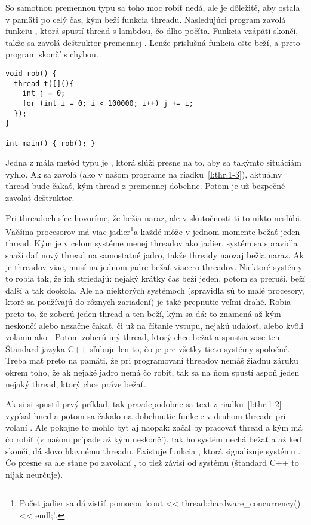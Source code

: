 So samotnou premennou typu  sa toho moc robiť nedá, ale je dôležité, aby ostala v pamäti po celý čas, kým beží funkcia threadu. 
Nasledujúci program zavolá funkciu , ktorá spustí thread s lambdou, čo dlho počíta. Funkcia  vzápätí skončí,
takže sa zavolá deštruktor premennej . Lenže príslušná funkcia ešte beží, a preto program skončí s chybou.

\begin{lstlisting}
void rob() {
  thread t([](){
    int j = 0;
    for (int i = 0; i < 100000; i++) j += i;
  });
}

int main() { rob(); }
\end{lstlisting}

Jedna z mála metód typu  je , ktorá slúži presne na to, aby sa takýmto situáciám vyhlo. 
Ak sa zavolá  (ako v našom programe na riadku~\ref{l:thr.1-3}), aktuálny thread bude čakať, kým thread z 
premennej  dobehne. Potom je už bezpečné zavolať deštruktor.

Pri threadoch síce hovoríme, že bežia naraz, ale v skutočnosti ti to nikto nesľúbi. Väčšina procesorov má viac jadier\footnote{%
  Počet jadier sa dá zistiť pomocou \prg!cout << thread::hardware_concurrency() << endl;!.
}a každé môže v jednom momente bežať jeden thread. Kým je v celom systéme menej threadov ako jadier, systém sa spravidla snaží dať nový thread na samostatné jadro, takže thready naozaj bežia naraz.
Ak je threadov viac, musí na jednom jadre bežať viacero threadov. Niektoré systémy to robia tak, že ich striedajú: nejaký krátky čas beží jeden, potom sa preruší,
beží ďalší a tak dookola. Ale na niektorých systémoch (spravidla sú to malé procesory, ktoré sa používajú do rôznych zariadení) je také prepnutie veľmi drahé.
Robia preto to, že zoberú jeden thread a ten beží, kým sa dá: to znamená až kým neskončí alebo nezačne čakať, či už na čítanie vstupu, nejakú udalosť, alebo kvôli
volaniu ako . Potom zoberú iný thread, ktorý chce bežať a spustia zase ten. 
Štandard jazyka C++ sľubuje len to, čo je pre všetky tieto systémy spoločné. Treba mať preto na pamäti, že pri programovaní threadov nemáš žiadnu záruku
okrem toho, že ak nejaké jadro nemá čo robiť, tak sa na ňom spustí aspoň jeden nejaký thread, ktorý chce práve bežať. 

Ak si si spustil prvý príklad, tak pravdepodobne sa text
z riadku~\ref{l:thr.1-2} vypísal hneď a potom sa čakalo na dobehnutie funkcie  v druhom threade pri volaní . Ale pokojne to mohlo
byť aj naopak: začal by pracovať thread  a kým má čo robiť (v našom prípade až kým neskončí), tak ho systém nechá bežať a až keď skončí, dá slovo hlavnému threadu.
Existuje funkcia , ktorá signalizuje systému . Čo presne sa ale stane po zavolaní , to tiež závisí od systému (štandard C++ to nijak neurčuje). 

